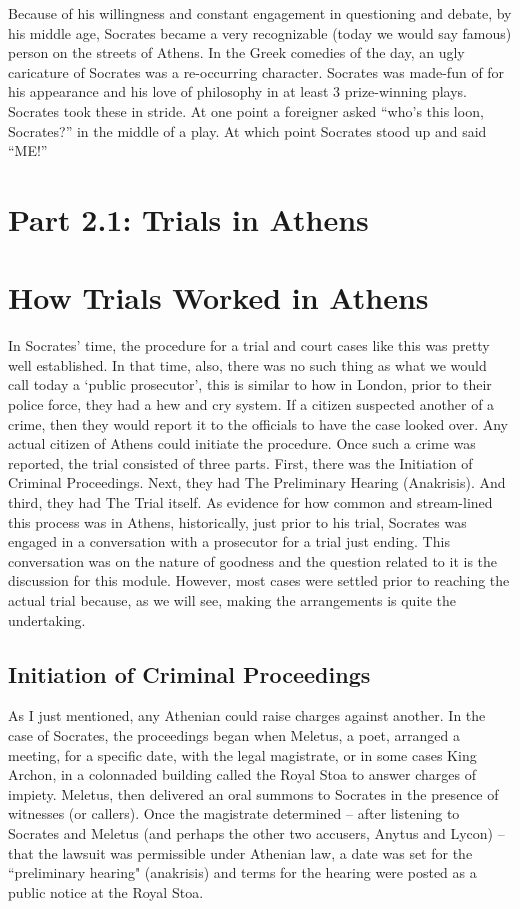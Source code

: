 Because of his willingness and constant engagement in questioning and debate, by his middle age, Socrates became a very recognizable (today we would say famous) person on the streets of Athens. In the Greek comedies of the day, an ugly caricature of Socrates was a re-occurring character. Socrates was made-fun of for his appearance and his love of philosophy in at least 3 prize-winning plays. Socrates took these in stride. At one point a foreigner asked “who’s this loon, Socrates?” in the middle of a play. At which point Socrates stood up and said “ME!”

\section{Part 2.1: Trials in Athens}

\section{How Trials Worked in Athens}

In Socrates' time, the procedure for a trial and court cases like this was pretty well established. In that time, also, there was no such thing as what we would call today a `public prosecutor', this is similar to how in London, prior to their police force, they had a hew and cry system. If a citizen suspected another of a crime, then they would report it to the officials to have the case looked over. Any actual citizen of Athens could initiate the procedure. Once such a crime was reported, the trial consisted of three parts. First, there was the Initiation of Criminal Proceedings. Next, they had The Preliminary Hearing (Anakrisis). And third, they had The Trial itself. As evidence for how common and stream-lined this process was in Athens, historically, just prior to his trial, Socrates was engaged in a conversation with a prosecutor for a trial just ending. This conversation was on the nature of goodness and the question related to it is the discussion for this module. However, most cases were settled prior to reaching the actual trial because, as we will see, making the arrangements is quite the undertaking.
\subsection{Initiation of Criminal Proceedings}

As I just mentioned, any Athenian could raise charges against another. In the case of Socrates, the proceedings began when Meletus, a poet, arranged a meeting, for a specific date, with the legal magistrate, or in some cases King Archon, in a colonnaded building called the Royal Stoa to answer charges of impiety. Meletus, then delivered an oral summons to Socrates in the presence of witnesses (or callers). Once the magistrate determined – after listening to Socrates and Meletus (and perhaps the other two accusers, Anytus and Lycon) – that the lawsuit was permissible under Athenian law, a date was set for the ``preliminary hearing" (anakrisis) and terms for the hearing were posted as a public notice at the Royal Stoa.
